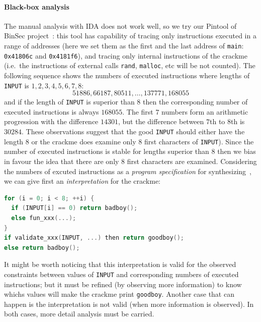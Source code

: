 \documentclass{easychair}
\begin{document}
\paragraph{Black-box analysis}
The manual analysis with IDA does not work well, so we try our Pintool of BinSec project~\autocite{binsec}: this tool has capability of tracing only instructions executed in a range of addresses (here we set them as the first and the last address of \texttt{main}: \texttt{0x41806c} and \texttt{0x4181f6}), and tracing only internal instructions of the crackme (i.e.~the instructions of external calls \texttt{rand}, \texttt{malloc}, etc will be not counted). The following sequence shows the numbers of executed instructions where lengths of \texttt{INPUT} is $1, 2, 3, 4, 5, 6, 7, 8$:
\begin{equation*}
  51886, 66187, 80511, \dots, 137771, 168055
\end{equation*}
and if the length of \texttt{INPUT} is superior than $8$ then the corresponding number of executed instructions is always $168055$. The first $7$ numbers form an arithmetic progression with the difference $14301$, but the difference between $7$th to $8$th is $30284$. These observations suggest that the good \texttt{INPUT} should either have the length $8$ or the crackme does examine only $8$ first characters of \texttt{INPUT}). Since the number of executed instructions is stable for lengths superior than $8$ then we bias in favour the idea that there are only $8$ first characters are examined. Considering the numbers of excuted instructions as a \emph{program specification} for synthesizing~\autocite{GulwaniPPDP102}, we can give first an \emph{interpretation} for the crackme:
\begin{lstlisting}[frame=lines, caption={Synthesizing of the crackme}, captionpos=b, boxpos=b, language={C}, label=lst:synthesis]
for (i = 0; i < 8; ++i) {
  if (INPUT[i] == 0) return badboy();
  else fun_xxx(...);
}
if validate_xxx(INPUT, ...) then return goodboy();
else return badboy();
\end{lstlisting}
It might be worth noticing that this interpretation is valid for the observed constraints between values of \texttt{INPUT} and corresponding numbers of executed instructions; but it must be refined (by observing more information) to know whichs values will make the crackme print \texttt{goodboy}. Another case that can happen is the interpretation is not valid (when more information is observed). In both cases, more detail analysis must be carried. 
\end{document}
